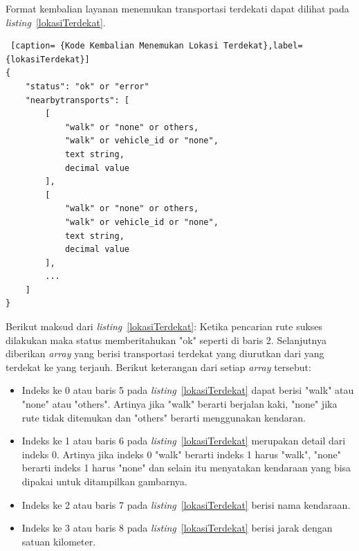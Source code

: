 Format kembalian layanan menemukan transportasi terdekati dapat dilihat pada \textit{listing}~\ref{lokasiTerdekat}.

\begin{lstlisting} [caption= {Kode Kembalian Menemukan Lokasi Terdekat},label={lokasiTerdekat}]
{
    "status": "ok" or "error"
    "nearbytransports": [
        [
            "walk" or "none" or others,
            "walk" or vehicle_id or "none",
            text string,
            decimal value
        ],
        [
            "walk" or "none" or others,
            "walk" or vehicle_id or "none",
            text string,
            decimal value
        ],
        ...     
    ]
}\end{lstlisting}
Berikut maksud dari \textit{listing}~\ref{lokasiTerdekat}: \newline
\hspace{0.5cm} Ketika pencarian rute sukses dilakukan maka status memberitahukan "ok" seperti di baris 2. Selanjutnya diberikan \textit{array} yang berisi transportasi terdekat yang diurutkan dari yang terdekat ke yang terjauh. Berikut keterangan dari setiap \textit{array} tersebut: 
\begin{itemize}
	\item Indeks ke 0 atau baris 5 pada \textit{listing}~\ref{lokasiTerdekat} dapat berisi "walk" atau "none" atau "others". Artinya  jika "walk" berarti berjalan kaki, "none" jika rute tidak ditemukan dan "others" berarti menggunakan kendaran.
	\item Indeks ke 1 atau baris 6 pada \textit{listing}~\ref{lokasiTerdekat} merupakan detail dari indeks 0. Artinya jika indeks 0 "walk" berarti indeks 1 harus "walk", "none" berarti indeks 1 harus "none" dan selain itu menyatakan kendaraan yang bisa dipakai untuk ditampilkan gambarnya.
	\item Indeks ke 2 atau baris 7 pada \textit{listing}~\ref{lokasiTerdekat} berisi nama kendaraan.
	\item Indeks ke 3 atau baris 8 pada \textit{listing}~\ref{lokasiTerdekat} berisi jarak dengan satuan kilometer.
\end{itemize}